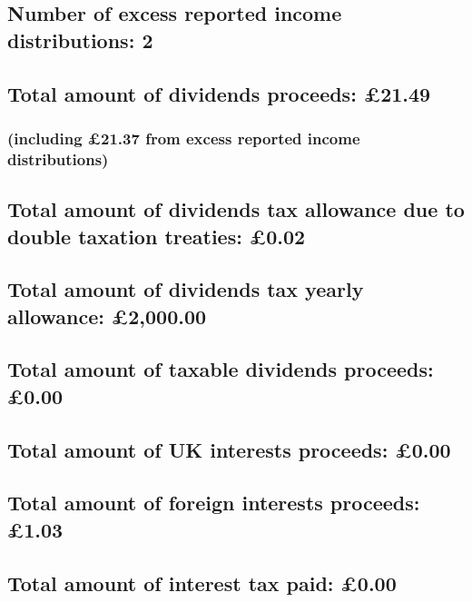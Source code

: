 \documentclass{article}
\begin{document}
\subsection*{Number of excess reported income distributions: 2}
\subsection*{Total amount of dividends proceeds: £21.49}
\subsubsection*{   (including £21.37 from excess reported income distributions)}
\subsection*{Total amount of dividends tax allowance due to double taxation treaties: £0.02}
\subsection*{Total amount of dividends tax yearly allowance: £2,000.00}
\subsection*{Total amount of taxable dividends proceeds: £0.00}
\subsection*{Total amount of UK interests proceeds: £0.00}
\subsection*{Total amount of foreign interests proceeds: £1.03}
\subsection*{Total amount of interest tax paid: £0.00}
\end{document}
